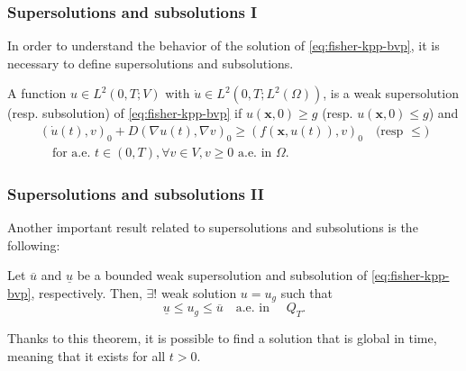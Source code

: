 \begin{frame}
    \frametitle{Supersolutions and subsolutions I}
    In order to understand the behavior of the solution of \eqref{eq:fisher-kpp-bvp}, it is necessary to define supersolutions and subsolutions. 
    \begin{definition}
        A function \(u \in L^2(0, T; V)\) with \(\dot{u} \in L^2(0, T; L^2(\Omega))\), is a weak supersolution (resp. subsolution) of \eqref{eq:fisher-kpp-bvp} if \(u(\bm{x}, 0) \geq g\) (resp. \(u(\bm{x}, 0) \leq g\)) and
        \begin{equation}
            \begin{split}
                \left(\dot{u}(t), v\right)_0 + D \left(\nabla u(t), \nabla v\right)_0 \geq (f(\bm{x}, u(t)), v)_0 \quad \text{(resp } \leq \text{)} \\ \quad \text{for a.e. } t \in (0, T), \forall v \in V, v \geq 0 \text{ a.e. in } \Omega.
            \end{split}
        \end{equation}
    \end{definition}
\end{frame}


\begin{frame}
    \frametitle{Supersolutions and subsolutions II}
    Another important result related to supersolutions and subsolutions is the following:
    \begin{theorem}
        Let \(\overline{u}\) and \(\underline{u}\) be a bounded weak supersolution and subsolution of \eqref{eq:fisher-kpp-bvp}, respectively. Then, \(\exists!\) weak solution \(u = u_g\) such that
        \begin{equation}
            \underline{u} \leq u_g \leq \overline{u} \quad \text{a.e. in } \quad Q_T.
        \end{equation}
        \label{thm:10.18}
    \end{theorem}
    Thanks to this theorem, it is possible to find a solution that is global in time, meaning that it exists for all \(t > 0\).
\end{frame}


